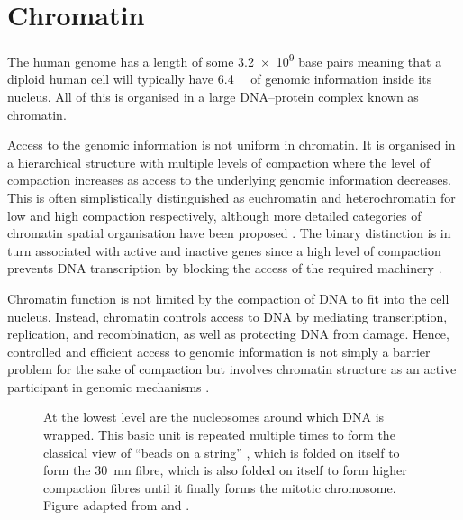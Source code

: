 \section{Chromatin}

  The human genome has a length of some \num{3.2e9}
  base pairs \citep{nature-first-human-genome-draft}
  meaning that a diploid human cell will
  typically have \SI{6.4}{\giga\bp} of genomic information inside
  its nucleus.
  All of this is organised in a large DNA--protein complex known as chromatin.

  Access to the genomic information is not uniform in chromatin.
  It is organised in a hierarchical structure with
  multiple levels of compaction  where
  the level of compaction increases as access to the underlying genomic
  information decreases.
  This is often simplistically distinguished as
  euchromatin and heterochromatin for low and
  high compaction respectively, although more detailed categories of
  chromatin spatial organisation have been proposed
  \citep{brehm2004colours, dixon2016chromatin-domains-review}.
  The binary distinction is in turn associated with active and inactive genes
  since a high level of compaction prevents DNA transcription by blocking
  the access of the required machinery \citep{ball2003portrait}.

  Chromatin function is not limited by the compaction of DNA
  to fit into the cell nucleus.
  Instead, chromatin controls access
  to DNA by mediating transcription, replication,
  and recombination, as
  well as protecting DNA from damage.  Hence, controlled and efficient
  access to genomic information is not simply a barrier problem for the sake
  of compaction but involves chromatin structure as an active
  participant in genomic mechanisms \citep{controlling-double-helix}.

  \begin{figure}
    \centering
    \def\svgwidth{\textwidth}
                 {At the lowest level are the nucleosomes around which
                  DNA is wrapped.
                  This basic unit is repeated multiple times to form
                  the classical view of ``beads on a string''
                  ,
                  which is folded on itself to form the
                  \SI{30}{\nano\meter} fibre,
                  which is also folded on itself to form higher
                  compaction fibres until it finally forms the
                  mitotic chromosome.
                  Figure adapted from \cite{alberts} and \cite{lodish}.}
    \label{fig:intro:chromatin-structure}
  \end{figure}


